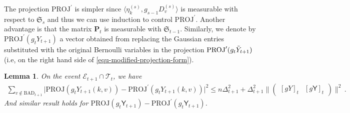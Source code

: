 \documentclass[11pt]{article}
\newtheorem{Lemma}[Theorem]{Lemma}
\numberwithin{equation}{section}
\begin{document}
The projection $\mathrm{PROJ}^{\prime}$ is simpler since  $\langle \eta^{(s)}_k, g_{s-1} D^{(s)}_v \rangle$ is measurable with respect to $\mathfrak{S}_{s}$ and thus we can use induction to control $\mathrm{PROJ}^{\prime}$. Another advantage is that the matrix $\mathbf{P}_t$ is measurable with $\mathfrak{S}_{t-1}$. Similarly, we denote by ${\mathrm{PROJ}}^{\prime} (g_t Y_{t+1})$ a vector obtained from replacing the Gaussian entries substituted with the original Bernoulli variables in the projection ${\mathrm{PROJ}}^{\prime} (g_t \Tilde{Y}_{t+1})$ (i.e, on the right hand side of \eqref{equ-modified-projection-form}). 
\begin{Lemma} {\label{lemma-projection-replace}}
On the event $\mathcal{E}_{t+1} \cap \mathcal{T}_t$, we have
\begin{align*}
    \sum_{v \not \in \mathrm{BAD}_{t+1}}
    \big| \mathrm{PROJ}(g_{t}Y_{t+1}(k,v)) -  {\mathrm{PROJ}}^{\prime} (g_{t}Y_{t+1}(k,v)) \big|^2 \leq n \Delta_{t+1}^2 + \Delta_{t+1}^2 \big\| \begin{pmatrix} [g Y]_t & [g \mathsf{Y}]_t \end{pmatrix} \big\|^2 \,.
\end{align*}
And similar result holds for $\mathrm{PROJ} (g_t\mathsf{Y}_{t+1}) - {\mathrm{PROJ}}^{\prime} (g_t\mathsf{Y}_{t+1})$.
\end{Lemma}
\end{document}
